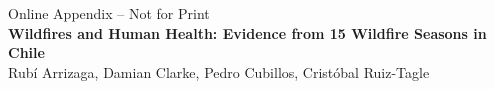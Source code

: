 \documentclass[11pt]{article}
\begin{document}
\begin{spacing}{1.3}





%
%

\end{spacing}
\clearpage



\begin{spacing}{1.3}


  \newpage
  
\appendix
\setcounter{page}{1}
\renewcommand{\thepage}{A\arabic{page}}



\begin{center}
{\Large Online Appendix -- Not for Print}\\
\textbf{Wildfires and Human Health: Evidence from 15 Wildfire Seasons in Chile} \\
Rub\'i Arrizaga, Damian Clarke, Pedro Cubillos, Crist\'obal Ruiz-Tagle
\end{center}
\end{spacing}
\end{document}
